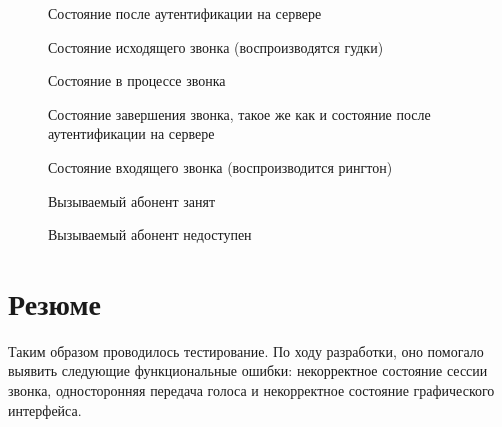 \begin{figure}[h]
\caption{Состояние после аутентификации на сервере}
\label{image:test2}
\end{figure}

\begin{figure}[h]
\caption{Состояние исходящего звонка (воспроизводятся гудки)}
\label{image:test3}
\end{figure}

\begin{figure}[h]
\caption{Состояние в процессе звонка}
\label{image:test4}
\end{figure}

\begin{figure}[h]
\caption{Состояние завершения звонка, такое же как и состояние после аутентификации на сервере}
\label{image:test5}
\end{figure}

\begin{figure}[h]
\caption{Состояние входящего звонка (воспроизводится рингтон)}
\label{image:test6}
\end{figure}

\begin{figure}[h]
\caption{Вызываемый абонент занят}
\label{image:test7}
\end{figure}

\begin{figure}[h]
\caption{Вызываемый абонент недоступен}
\label{image:test8}
\end{figure}

\section{Резюме}

Таким образом проводилось тестирование. По ходу разработки, оно помогало выявить следующие функциональные ошибки: некорректное состояние сессии звонка, односторонняя передача голоса и некорректное состояние графического интерфейса.
